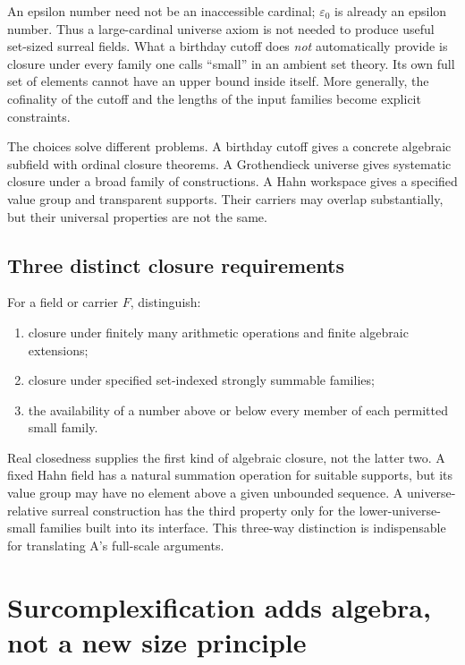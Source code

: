 \documentclass[11pt,letterpaper]{article}
\numberwithin{equation}{section}
\theoremstyle{definition}
\theoremstyle{remark}
\begin{document}
An epsilon number need not be an inaccessible cardinal; $\varepsilon_0$ is already an epsilon number. Thus a large-cardinal universe axiom is not needed to produce useful set-sized surreal fields. What a birthday cutoff does \emph{not} automatically provide is closure under every family one calls ``small'' in an ambient set theory. Its own full set of elements cannot have an upper bound inside itself. More generally, the cofinality of the cutoff and the lengths of the input families become explicit constraints.

The choices solve different problems. A birthday cutoff gives a concrete algebraic subfield with ordinal closure theorems. A Grothendieck universe gives systematic closure under a broad family of constructions. A Hahn workspace gives a specified value group and transparent supports. Their carriers may overlap substantially, but their universal properties are not the same.

\subsection{Three distinct closure requirements}
For a field or carrier $F$, distinguish:
\begin{enumerate}
\item closure under finitely many arithmetic operations and finite algebraic extensions;
\item closure under specified set-indexed strongly summable families;
\item the availability of a number above or below every member of each permitted small family.
\end{enumerate}
Real closedness supplies the first kind of algebraic closure, not the latter two. A fixed Hahn field has a natural summation operation for suitable supports, but its value group may have no element above a given unbounded sequence. A universe-relative surreal construction has the third property only for the lower-universe-small families built into its interface. This three-way distinction is indispensable for translating A's full-scale arguments.

\section{Surcomplexification adds algebra, not a new size principle}\label{sec:complex}
\end{document}
